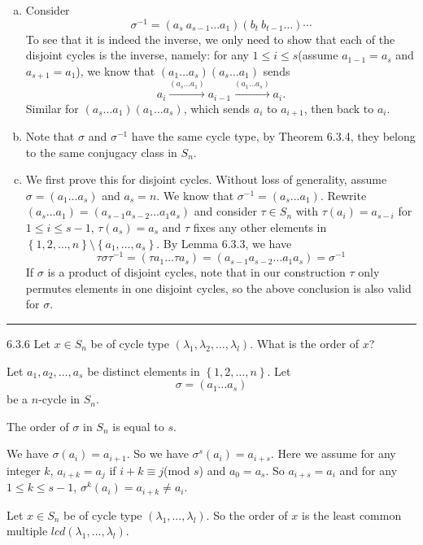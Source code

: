 \documentclass[a4paper, 12pt]{article}
\begin{document}
\begin{solution}
\begin{enumerate}[(a)]
\item Consider 
\[\sigma^{-1}=(a_s\ a_{s-1}\ldots a_1)(b_t\  b_{t-1}\ldots)\cdots\]
To see that it is indeed the inverse, we only need to show that each of the disjoint cycles is the inverse, namely: for any \(1\leq i\leq s\)(assume \(a_{1-1}=a_s\) and \(a_{s+1}=a_1\)), we know that \((a_1\ldots a_s)(a_s\ldots a_1)\) sends 
\[a_i\xrightarrow{(a_s\ldots a_1)}a_{i-1}\xrightarrow{(a_1\ldots a_s)}a_i.\]
Similar for \((a_s\ldots a_1)(a_1\ldots a_s)\), which sends \(a_i\) to \(a_{i+1}\), then back to \(a_i\).
\item Note that \(\sigma\) and \(\sigma^{-1}\) have the same cycle type, by Theorem 6.3.4, they belong to the same conjugacy class in \(S_n\).
\item We first prove this for disjoint cycles. Without loss of generality, assume \(\sigma=(a_1\ldots a_s)\) and \(a_s=n\). We know that \(\sigma^{-1}=(a_s\ldots a_1)\). Rewrite 
\((a_s\ldots a_1)=(a_{s-1} a_{s-2}\ldots a_1 a_s)\) and consider \(\tau\in S_n\) with \(\tau(a_i)=a_{s-i}\) for \(1\leq i\leq s-1\), \(\tau(a_s)=a_s\) and \(\tau\) fixes any other elements in \(\left\{ 1,2,\ldots,n \right\}\setminus \left\{ a_1,\ldots,a_s\right\}\). By 
Lemma 6.3.3, we have 
\[\tau\sigma\tau^{-1}=(\tau a_1\ldots \tau a_s)=(a_{s-1} a_{s-2}\ldots a_1 a_s)=\sigma^{-1}\]
If \(\sigma\) is a product of disjoint cycles, note that in our construction \(\tau\) only permutes elements in one disjoint cycles, so the above conclusion is also valid for \(\sigma\).
\end{enumerate}
\end{solution}

\noindent\rule{7in}{2.8pt}
\begin{problem}{6.3.6}
Let \(x\in S_n\) be of cycle type \((\lambda_1,\lambda_2,\ldots,\lambda_l)\). What is the order of \(x\)?
\end{problem}
\begin{solution}
Let \(a_1,a_2,\ldots, a_s\) be distinct elements in \(\left\{ 1,2,\ldots,n \right\}\). Let 
\[\sigma=(a_1\ldots a_s)\]
be a \(n\)-cycle in \(S_n\). 
\begin{claim}
The order of \(\sigma\) in \(S_n\) is equal to \(s\).
\end{claim} 
\begin{claimproof}
We have \(\sigma(a_i)=a_{i+1}\). So we have \(\sigma^s(a_i)=a_{i+s}\). Here we assume for any integer \(k\), \(a_{i+k}=a_j\) if \(i+k\equiv j\)(mod \(s\)) and \(a_0=a_s\). So \(a_{i+s}=a_i\) and 
for any \(1\leq k\leq s-1\), \(\sigma^k(a_i)=a_{i+k}\neq a_i\). 
\end{claimproof} 
Let \(x\in S_n\) be of cycle type \((\lambda_1,\ldots,\lambda_l)\). So the order of \(x\) is the least common multiple \(lcd(\lambda_1,\ldots,\lambda_l)\). 
\end{solution}
\end{document}
